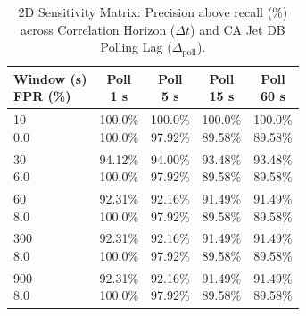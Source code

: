 \begin{table}[tbp]
\centering
\caption{2D Sensitivity Matrix: Precision above recall (\%) across Correlation Horizon ($\Delta t$) and CA Jet DB Polling Lag ($\Delta_{\text{poll}}$).}
\label{tab:sensitivity_matrix}
\evidencetable
\setlength{\tabcolsep}{2pt}
\begin{tabular}{@{}lcccc@{}}
\toprule
\makecell{Window (s)\\FPR (\%)} & \makecell{Poll\\1 s} & \makecell{Poll\\5 s} & \makecell{Poll\\15 s} & \makecell{Poll\\60 s} \\
\midrule
\makecell[l]{10\\0.0} & \makecell{100.0\%\\100.0\%} & \makecell{100.0\%\\97.92\%} & \makecell{100.0\%\\89.58\%} & \makecell{100.0\%\\89.58\%} \\
\makecell[l]{30\\6.0} & \makecell{94.12\%\\100.0\%} & \makecell{94.00\%\\97.92\%} & \makecell{93.48\%\\89.58\%} & \makecell{93.48\%\\89.58\%} \\
\makecell[l]{60\\8.0} & \makecell{92.31\%\\100.0\%} & \makecell{92.16\%\\97.92\%} & \makecell{91.49\%\\89.58\%} & \makecell{91.49\%\\89.58\%} \\
\makecell[l]{300\\8.0} & \makecell{92.31\%\\100.0\%} & \makecell{92.16\%\\97.92\%} & \makecell{91.49\%\\89.58\%} & \makecell{91.49\%\\89.58\%} \\
\makecell[l]{900\\8.0} & \makecell{92.31\%\\100.0\%} & \makecell{92.16\%\\97.92\%} & \makecell{91.49\%\\89.58\%} & \makecell{91.49\%\\89.58\%} \\
\bottomrule
\end{tabular}
\end{table}

